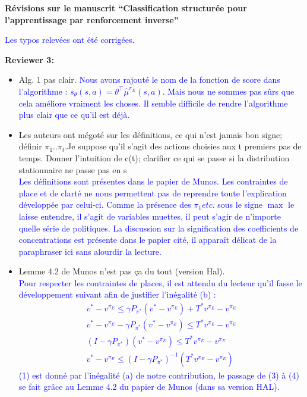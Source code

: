\documentclass[11pt, a4paper]{letter}
\begin{document}
\begin{letter}{\large \textbf{Révisions sur le manuscrit ``Classification structurée pour l'apprentissage par renforcement inverse''}}
\begin{itemize}
\end{itemize}\vspace{1.5 em}
  \textcolor{blue}{Les typos relevées ont été corrigées.}
\vspace{.5cm}
\newpage
\begin{large} \textbf{Reviewer 3:} \\ \end{large}
\begin{itemize}
\item Alg. 1 pas clair.
\textcolor{blue}{Nous avons rajouté le nom de la fonction de score dans l'algorithme :  $s_\theta(s,a) = \theta^\top\hat{\mu}^{\pi_E}(s,a)$. Mais nous ne sommes pas sûrs que cela améliore vraiment les choses. Il semble difficile de rendre l'algorithme plus clair que ce qu'il est déjà.}
\item Les auteurs ont mégoté sur les définitions, ce qui n'est jamais bon signe; définir $\pi_1..\pi_t$.Je suppose qu'il s'agit des actions choisies aux t premiers pas de temps.
Donner l'intuition de c(t); clarifier ce qui se passe si la distribution stationnaire ne passe pas en s\\
\textcolor{blue}{Les définitions sont présentes dans le papier de Munos. Les contraintes de place et de clarté ne nous permettent pas de reprendre toute l'explication développée par celui-ci. Comme la présence des $\pi_1 etc.$ sous le signe $\max$ le laisse entendre, il s'agit de variables muettes, il peut s'agir de n'importe quelle série de politiques. La discussion sur la signification des coefficients de concentrations est présente dans le papier cité, il apparaît délicat de la paraphraser ici sans alourdir la lecture.}
\item Lemme 4.2 de Munos n'est pas ça du tout (version Hal).\\
\textcolor{blue}{Pour respecter les contraintes de places, il est attendu du lecteur qu'il fasse le développement suivant afin de justifier l'inégalité (b) :
\begin{eqnarray}
  v^{*} - v^{\pi_E} \leq \gamma P_{\pi^*}(v^*-v^{\pi_E}) + T^*
    v^{\pi_E} - v^{\pi_E}\\
    v^{*} - v^{\pi_E} - \gamma P_{\pi^*}(v^*-v^{\pi_E}) \leq T^*
    v^{\pi_E} - v^{\pi_E}\\
    (I- \gamma P_{\pi^*})(v^*-v^{\pi_E}) \leq T^*
    v^{\pi_E} - v^{\pi_E}\\
    v^*-v^{\pi_E} \leq (I- \gamma P_{\pi^*}) ^{-1}(T^*
    v^{\pi_E} - v^{\pi_E})
 \end{eqnarray}
(1) est donné par l'inégalité (a) de notre contribution, le passage de (3) à (4) se fait grâce au Lemme 4.2 du papier de Munos (dans sa version HAL).
}
\end{itemize}
\end{letter}
\end{document}
